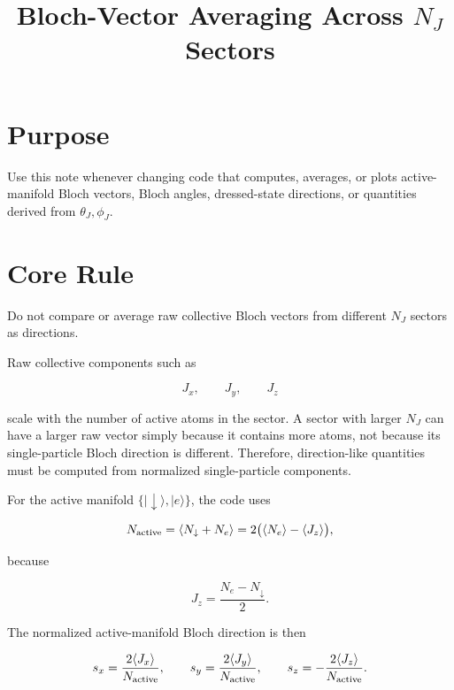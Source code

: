 \documentclass[11pt]{article}
\title{Bloch-Vector Averaging Across \(N_J\) Sectors}
\author{}
\date{}
\begin{document}
\maketitle

\section*{Purpose}

Use this note whenever changing code that computes, averages, or plots
active-manifold Bloch vectors, Bloch angles, dressed-state directions, or
quantities derived from \(\theta_J,\phi_J\).

\section*{Core Rule}

Do not compare or average raw collective Bloch vectors from different \(N_J\)
sectors as directions.

Raw collective components such as

\begin{equation}
J_x,\qquad J_y,\qquad J_z
\end{equation}

scale with the number of active atoms in the sector. A sector with larger
\(N_J\) can have a larger raw vector simply because it contains more atoms, not
because its single-particle Bloch direction is different. Therefore,
direction-like quantities must be computed from normalized single-particle
components.

For the active manifold \(\{|\downarrow\rangle,|e\rangle\}\), the code uses

\begin{equation}
N_{\rm active}
=
\langle N_\downarrow + N_e\rangle
=
2\bigl(\langle N_e\rangle-\langle J_z\rangle\bigr),
\end{equation}

because

\begin{equation}
J_z=\frac{N_e-N_\downarrow}{2}.
\end{equation}

The normalized active-manifold Bloch direction is then

\begin{equation}
s_x=\frac{2\langle J_x\rangle}{N_{\rm active}},
\qquad
s_y=\frac{2\langle J_y\rangle}{N_{\rm active}},
\qquad
s_z=-\frac{2\langle J_z\rangle}{N_{\rm active}}.
\end{equation}
\end{document}
